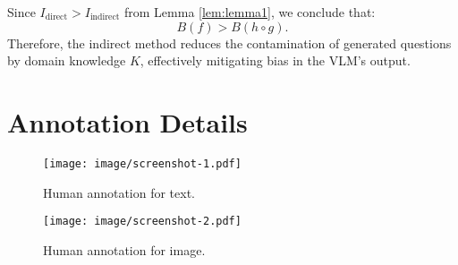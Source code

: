 \begin{proof1}
Since \( I_{\text{direct}} > I_{\text{indirect}} \) from Lemma \autoref{lem:lemma1}, we conclude that:
\begin{equation}
B(f) > B(h \circ g).
\end{equation}
Therefore, the indirect method reduces the contamination of generated questions by domain knowledge \( K \), effectively mitigating bias in the VLM's output.
\end{proof1}











\clearpage




\section{Annotation Details}
\label{app:annotation_details}

\begin{figure}[h]
    \centering
    \texttt{[image: image/screenshot-1.pdf]}
    \caption{Human annotation for text.}
    \label{fig:screenshot-1}
\end{figure}

\begin{figure}[h]
    \centering
    \texttt{[image: image/screenshot-2.pdf]}
    \caption{Human annotation for image.}
    \label{fig:screenshot-2}
\end{figure}